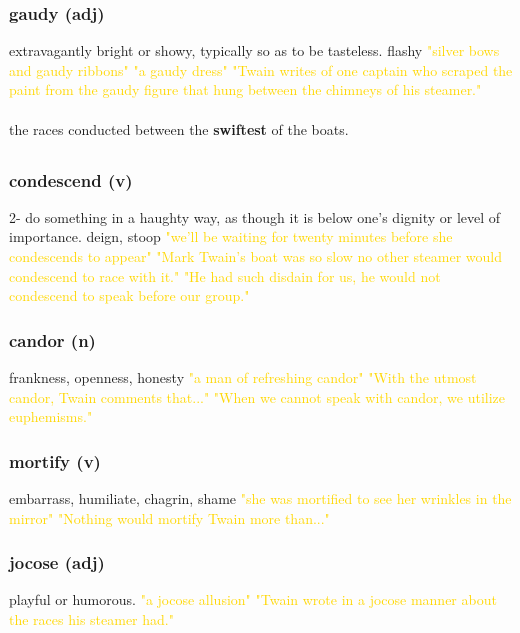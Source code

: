 \documentclass{proc}
\begin{document}
			 \subsubsection{\textcolor{brickred}{gaudy} (adj)}
			 extravagantly bright or showy, typically so as to be tasteless. flashy
			 \textcolor{gold}{"silver bows and gaudy ribbons"
			 "a gaudy dress"
			 "Twain writes 
			 of one captain who scraped the paint from the gaudy figure 
			 that hung between the chimneys of his steamer."}\\
			 \\
			 the races conducted between the 
			 \textbf{swiftest} of the boats. 
			
		\newpage 
		\subsection{}
		\subsubsection{\textcolor{brickred}{condescend} (v)}
		2- do something in a haughty way, as though it is below one's dignity or level of importance. deign, stoop
		\textcolor{gold}{"we'll be waiting for twenty minutes before she condescends to appear"
		"Mark Twain's boat was so slow no other steamer would 
		condescend to race with it."
		"He had such disdain for us, he would not condescend to speak before
		our group."}
		
		\subsubsection{\textcolor{brickred}{candor} (n)}
		frankness,
		openness,
		honesty
		\textcolor{gold}{"a man of refreshing candor"
		"With the utmost candor, Twain 
		comments that..."
		"When we cannot speak with candor, we utilize euphemisms."}
		
		\subsubsection{\textcolor{brickred}{mortify} (v)}
		embarrass,
		humiliate,
		chagrin,
		shame
		\textcolor{gold}{"she was mortified to see her wrinkles in the mirror"
		"Nothing 
		would mortify Twain more than..."}
		
		\subsubsection{\textcolor{brickred}{jocose} (adj)}
		playful or humorous.
		\textcolor{gold}{"a jocose allusion"
		"Twain wrote in a jocose 
		manner about the races his steamer had."}
		
\end{document}
